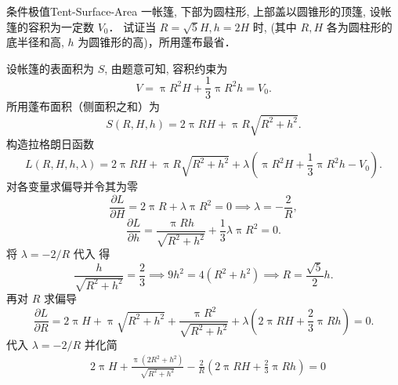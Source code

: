 \begin{problem}{条件极值}{Tent-Surface-Area}
    一帐篷, 下部为圆柱形, 上部盖以圆锥形的顶篷, 设帐篷的容积为一定数 $V_0$．
    试证当 $R = \sqrt{5}H, h = 2H$ 时, (其中 $R, H$ 各为圆柱形的底半径和高, $h$ 为圆锥形的高)，所用蓬布最省．
\end{problem}

\begin{myproof}
    设帐篷的表面积为 $S$, 由题意可知, 容积约束为
    \begin{equation}\label{eq:volume-const-1}
        V = \uppi R^2 H + \frac{1}{3} \uppi R^2 h = V_0 .
    \end{equation}
    所用蓬布面积（侧面积之和）为
    \begin{equation}\label{eq:surface-area-1}
        S(R, H, h) = 2 \uppi R H + \uppi R \sqrt{R^2 + h^2} .
    \end{equation}
    构造拉格朗日函数
    \begin{equation}
        L(R, H, h, \lambda) = 2 \uppi R H + \uppi R \sqrt{R^2 + h^2} + \lambda \left( \uppi R^2 H + \frac{1}{3} \uppi R^2 h - V_0 \right) .
    \end{equation}
    对各变量求偏导并令其为零
    \begin{equation}\label{eq:partial-H}
        \frac{\partial L}{\partial H} = 2 \uppi R + \lambda \uppi R^2 = 0 \implies \lambda = -\frac{2}{R} ,
    \end{equation}
    \begin{equation}\label{eq:partial-h}
        \frac{\partial L}{\partial h} = \frac{\uppi R h}{\sqrt{R^2 + h^2}} + \frac{1}{3} \lambda \uppi R^2 = 0 .
    \end{equation}
    将 $\lambda = -2/R$ 代入  得
    \begin{equation}
        \frac{h}{\sqrt{R^2 + h^2}} = \frac{2}{3} \implies 9h^2 = 4(R^2 + h^2) \implies R = \frac{\sqrt{5}}{2}h .
    \end{equation}
    再对 $R$ 求偏导
    \begin{equation}
        \frac{\partial L}{\partial R} = 2 \uppi H + \uppi \sqrt{R^2 + h^2} + \frac{\uppi R^2}{\sqrt{R^2 + h^2}} + \lambda \left( 2 \uppi R H + \frac{2}{3} \uppi R h \right) = 0 .
    \end{equation}
    代入 $\lambda = -2/R$ 并化简
    \begin{equation}
        \begin{aligned}
                     & 2 \uppi H + \frac{\uppi (2R^2 + h^2)}{\sqrt{R^2 + h^2}} - \frac{2}{R} \left( 2 \uppi R H + \frac{2}{3} \uppi R h \right) = 0 \\

\end{aligned}
\end{equation}
\end{myproof}
